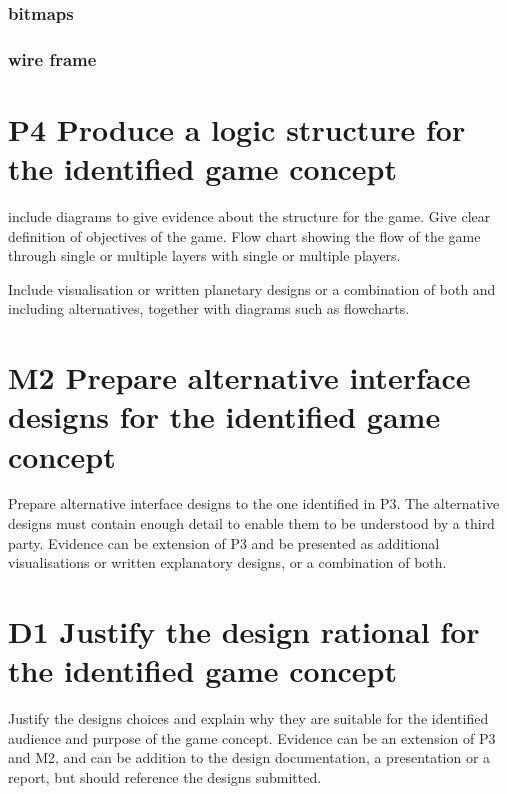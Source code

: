 \documentclass{article}
\begin{document}
\subsubsection{bitmaps}

\subsubsection{wire frame}

\section{P4 Produce a logic structure for the identified game concept}
include diagrams to give evidence about the structure for the game. Give clear definition of objectives of the game. Flow chart showing the flow of the game through single or multiple layers with single or multiple players.

Include visualisation or written planetary designs or a combination of both and including alternatives, together with diagrams such as flowcharts.


\section{M2 Prepare alternative interface designs for the identified game concept}
Prepare alternative interface designs to the one identified in P3. The alternative designs must contain enough detail to enable them to be understood by a third party. Evidence can be extension of P3 and be presented as additional visualisations or written explanatory designs, or a combination of both.




\section{D1 Justify the design rational for the identified game concept}
Justify the designs choices and explain why they are suitable for the identified audience and purpose of the game concept. Evidence can be an extension of P3 and M2, and can be addition to the design documentation, a presentation or a report, but should reference the designs submitted.
\end{document}
